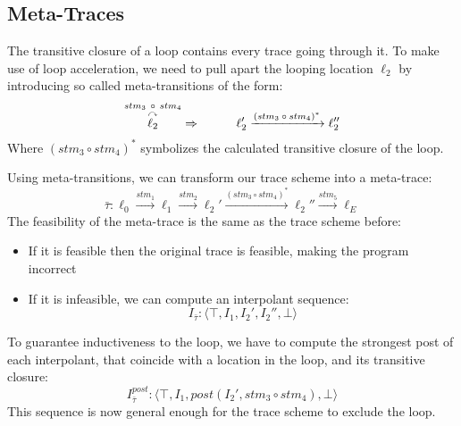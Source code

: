 \documentclass{article}
\newcommand\mycom[1]{}
\newcommand\mycom[1]{#1}
\newcommand{\jw}[1]{\mycom{\todo[color=blue!40,inline]{\small JW: #1}}}
\begin{document}
\subsection{Meta-Traces}
The transitive closure of a loop contains every trace going through it. To make use of loop acceleration, we need to pull apart the looping location $\ell_2$ by introducing so called meta-transitions of the form:
\begin{equation*}
	\overset{stm_3\ \circ \ stm_4}{\overset{\curvearrowright}{\ell_2}} \Rightarrow \hspace*{1cm} \ell_2' \xrightarrow{\text{$(stm_3 \circ stm_4)^*$}} \ell_2''
\end{equation*}
Where $(stm_3 \circ stm_4)^*$ symbolizes the calculated transitive closure of the loop. \par
Using meta-transitions, we can transform our trace scheme into a meta-trace:
\begin{equation*}
	\bar{\tau}: \ell_0 \xrightarrow{\text{$stm_1$}} \ell_1 \xrightarrow{\text{$stm_2$}} \ell_2' \xrightarrow{\text{$(stm_3 \circ stm_4)^*$}} \ell_2'' \xrightarrow{\text{$stm_5$}} \ell_E
\end{equation*}
The feasibility of the meta-trace is the same as the trace scheme before: \\
\begin{itemize}
	\item  If it is feasible then the original trace is feasible, making the program incorrect
	\item If it is infeasible, we can compute an interpolant sequence: \\
	\begin{equation*}
	I_{\bar{\tau}}: \langle \top, I_1, I_2', I_2'', \bot  \rangle
	\end{equation*}
\end{itemize}

\jw{todo: Why?}
To guarantee inductiveness to the loop, we have to compute the strongest post of each interpolant, that coincide with a location in the loop, and its transitive closure:
\begin{equation*}
I_{\bar{\tau}}^{post}: \langle \top, I_1, post(I_2', stm_3 \circ stm_4), \bot  \rangle
\end{equation*}
This sequence is now general enough for the trace scheme to exclude the loop.
\end{document}
